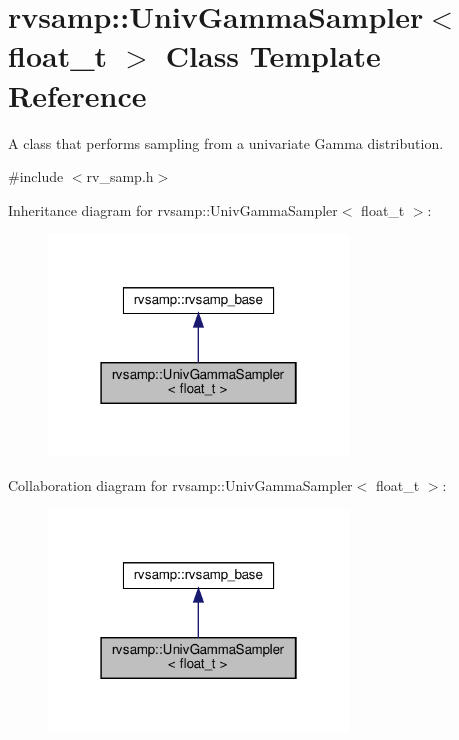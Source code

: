 \hypertarget{classrvsamp_1_1UnivGammaSampler}{}\section{rvsamp\+:\+:Univ\+Gamma\+Sampler$<$ float\+\_\+t $>$ Class Template Reference}
\label{classrvsamp_1_1UnivGammaSampler}


A class that performs sampling from a univariate Gamma distribution.  




{\ttfamily \#include $<$rv\+\_\+samp.\+h$>$}



Inheritance diagram for rvsamp\+:\+:Univ\+Gamma\+Sampler$<$ float\+\_\+t $>$\+:
\nopagebreak
\begin{figure}[H]
\begin{center}
\leavevmode
\includegraphics[width=226pt]{classrvsamp_1_1UnivGammaSampler__inherit__graph}
\end{center}
\end{figure}


Collaboration diagram for rvsamp\+:\+:Univ\+Gamma\+Sampler$<$ float\+\_\+t $>$\+:
\nopagebreak
\begin{figure}[H]
\begin{center}
\leavevmode
\includegraphics[width=226pt]{classrvsamp_1_1UnivGammaSampler__coll__graph}
\end{center}
\end{figure}
